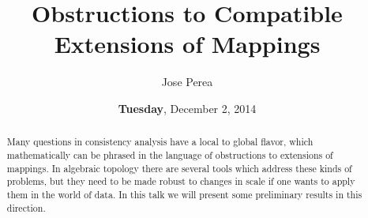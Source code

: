 \documentclass{UAmathtalk}
\author{Jose Perea}
\title{Obstructions to Compatible\\ Extensions of Mappings}
\date{\textbf{Tuesday}, December 2, 2014}
\begin{document}
\maketitle

\begin{abstract}
Many questions in consistency analysis have a local to global flavor, which mathematically can be phrased in the language of obstructions to extensions of mappings. In algebraic topology there are several tools which address these kinds of problems, but they need to be made robust to changes in scale if one wants to apply them in the world of data. In this talk we will present some preliminary results in this direction.
\end{abstract}
\end{document}
